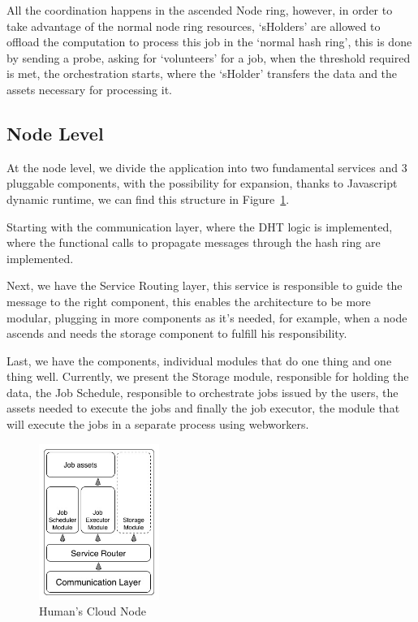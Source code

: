 \documentclass{./llncs2e/llncs}
\begin{document}
All the coordination happens in the ascended Node ring, however, in order to take advantage of the normal node ring resources, `sHolders' are allowed to offload the computation to process this job in the `normal hash ring', this is done by sending a probe, asking for `volunteers' for a job, when the threshold required is met, the orchestration starts, where the `sHolder' transfers the data and the assets necessary for processing it.




\subsection{Node Level}

At the node level, we divide the application into two fundamental services and 3 pluggable components, with the possibility for expansion, thanks to Javascript dynamic runtime, we can find this structure in Figure~\ref{fig:hcnode}.

Starting with the communication layer, where the DHT logic is implemented, where the functional calls to propagate messages through the hash ring are implemented. 

Next, we have the Service Routing layer, this service is responsible to guide the message to the right component, this enables the architecture to be more modular, plugging in more components as it's needed, for example, when a node ascends and needs the storage component to fulfill his responsibility.

Last, we have the components, individual modules that do one thing and one thing well. Currently, we present the Storage module, responsible for holding the data, the Job Schedule, responsible to orchestrate jobs issued by the users, the assets needed to execute the jobs and finally the job executor, the module that will execute the jobs in a separate process using webworkers.


\begin{figure}[h!]
  \centering
  \includegraphics[width=0.35\textwidth]{img/node.jpg}
  \caption{Human's Cloud Node}
  \label{fig:hcnode}
\end{figure}
\end{document}
